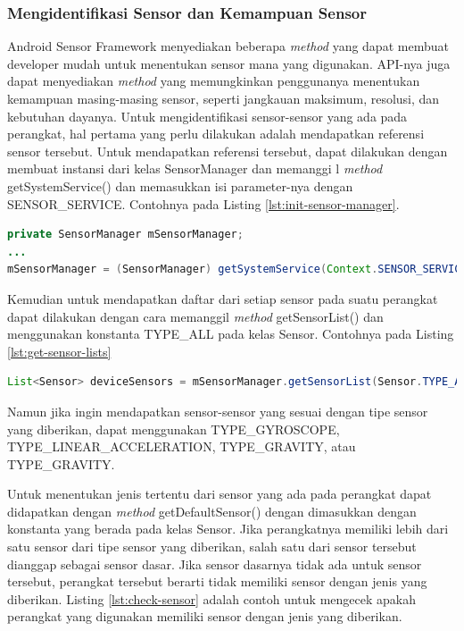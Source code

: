 \subsubsection{Mengidentifikasi Sensor dan Kemampuan Sensor}
\label{sssec:mengidentifikasi_sensor_dan_kapabilitas_sensor}
Android Sensor Framework menyediakan beberapa \textit{method} yang dapat membuat developer mudah untuk menentukan sensor mana yang digunakan. API-nya juga dapat menyediakan \textit{method} yang memungkinkan penggunanya menentukan kemampuan masing-masing sensor, seperti jangkauan maksimum, resolusi, dan kebutuhan dayanya. Untuk mengidentifikasi sensor-sensor yang ada pada perangkat, hal pertama yang perlu dilakukan adalah mendapatkan referensi sensor tersebut. Untuk mendapatkan referensi tersebut, dapat dilakukan dengan membuat instansi dari kelas SensorManager dan memanggi  l \textit{method} getSystemService() dan memasukkan isi parameter-nya dengan SENSOR\_SERVICE. Contohnya pada Listing \ref{lst:init-sensor-manager}.
 
\begin{lstlisting}[caption={Contoh inisialisasi kelas SensorManager},label={lst:init-sensor-manager},language=java]
private SensorManager mSensorManager;
...
mSensorManager = (SensorManager) getSystemService(Context.SENSOR_SERVICE);
\end{lstlisting}

Kemudian untuk mendapatkan daftar dari setiap sensor pada suatu perangkat dapat dilakukan dengan cara memanggil \textit{method} getSensorList() dan menggunakan konstanta TYPE\_ALL pada kelas Sensor. Contohnya pada Listing \ref{lst:get-sensor-lists}

\begin{lstlisting}[caption={Contoh untuk mendapatkan daftar dari setiap sensor yang ada},label={lst:get-sensor-lists},language=java]
List<Sensor> deviceSensors = mSensorManager.getSensorList(Sensor.TYPE_ALL);
\end{lstlisting}

Namun jika ingin mendapatkan sensor-sensor yang sesuai dengan tipe sensor yang diberikan, dapat menggunakan TYPE\_GYROSCOPE, TYPE\_LINEAR\_ACCELERATION, TYPE\_GRAVITY, atau TYPE\_GRAVITY.

Untuk menentukan jenis tertentu dari sensor yang ada pada perangkat dapat didapatkan dengan \textit{method} getDefaultSensor() dengan dimasukkan dengan konstanta yang berada pada kelas Sensor. Jika perangkatnya memiliki lebih dari satu sensor dari tipe sensor yang diberikan, salah satu dari sensor tersebut dianggap sebagai sensor dasar. Jika sensor dasarnya tidak ada untuk sensor tersebut, perangkat tersebut berarti tidak memiliki sensor dengan jenis yang diberikan. Listing \ref{lst:check-sensor} adalah contoh untuk mengecek apakah perangkat yang digunakan memiliki sensor dengan jenis yang diberikan.

